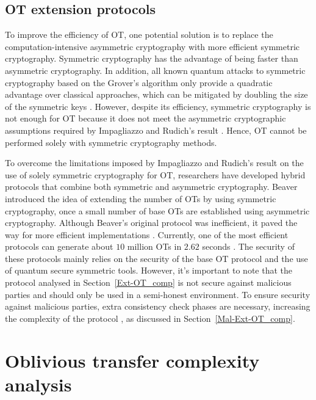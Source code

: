 \subsection{OT extension protocols} \label{Ext-OT}

To improve the efficiency of OT, one potential solution is to replace the computation-intensive asymmetric cryptography with more efficient symmetric cryptography. Symmetric cryptography has the advantage of being faster than asymmetric cryptography. In addition, all known quantum attacks to symmetric cryptography based on the Grover's algorithm only provide a quadratic advantage over classical approaches, which can be mitigated by doubling the size of the symmetric keys \cite{Bernstein2017}. However, despite its efficiency, symmetric cryptography is not enough for OT because it does not meet the asymmetric cryptographic assumptions required by Impagliazzo and Rudich's result \cite{IR99}. Hence, OT cannot be performed solely with symmetric cryptography methods.

To overcome the limitations imposed by Impagliazzo and Rudich's result \cite{IR99} on the use of solely symmetric cryptography for OT, researchers have developed hybrid protocols that combine both symmetric and asymmetric cryptography. Beaver \cite{B96} introduced the idea of extending the number of OTs by using symmetric cryptography, once a small number of base OTs are established using asymmetric cryptography. Although Beaver's original protocol was inefficient, it paved the way for more efficient implementations \cite{IKNP03, N07, NNOB12, ALSZ13, ALSZ15}. Currently, one of the most efficient protocols can generate about $10$ million OTs in $2.62$ seconds \cite{ALSZ13}. The security of these protocols mainly relies on the security of the base OT protocol and the use of quantum secure symmetric tools. However, it's important to note that the protocol analysed in Section~\ref{Ext-OT_comp} \cite{ALSZ13} is not secure against malicious parties and should only be used in a semi-honest environment. To ensure security against malicious parties, extra consistency check phases are necessary, increasing the complexity of the protocol \cite{ALSZ15, KOS15}, as discussed in Section~\ref{Mal-Ext-OT_comp}.



\section{Oblivious transfer complexity analysis} \label{HQOT_comp}

